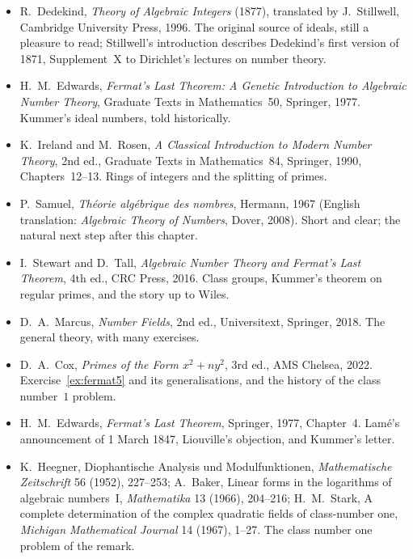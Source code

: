 \begin{itemize}
\item R.~Dedekind, \emph{Theory of Algebraic Integers} (1877), translated by J.~Stillwell, Cambridge University Press, 1996. The original source of ideals, still a pleasure to read; Stillwell's introduction describes Dedekind's first version of 1871, Supplement~X to Dirichlet's lectures on number theory.
\item H.~M.~Edwards, \emph{Fermat's Last Theorem: A Genetic Introduction to Algebraic Number Theory}, Graduate Texts in Mathematics~50, Springer, 1977. Kummer's ideal numbers, told historically.
\item K.~Ireland and M.~Rosen, \emph{A Classical Introduction to Modern Number Theory}, 2nd ed., Graduate Texts in Mathematics~84, Springer, 1990, Chapters~12--13. Rings of integers and the splitting of primes.
\item P.~Samuel, \emph{Th\'eorie alg\'ebrique des nombres}, Hermann, 1967 (English translation: \emph{Algebraic Theory of Numbers}, Dover, 2008). Short and clear; the natural next step after this chapter.
\item I.~Stewart and D.~Tall, \emph{Algebraic Number Theory and Fermat's Last Theorem}, 4th ed., CRC Press, 2016. Class groups, Kummer's theorem on regular primes, and the story up to Wiles.
\item D.~A.~Marcus, \emph{Number Fields}, 2nd ed., Universitext, Springer, 2018. The general theory, with many exercises.
\item D.~A.~Cox, \emph{Primes of the Form $x^2+ny^2$}, 3rd ed., AMS Chelsea, 2022. Exercise~\ref{ex:fermat5} and its generalisations, and the history of the class number~$1$ problem.
\item H.~M.~Edwards, \emph{Fermat's Last Theorem}, Springer, 1977, Chapter~4. Lam\'e's announcement of 1 March 1847, Liouville's objection, and Kummer's letter.
\item K.~Heegner, Diophantische Analysis und Modulfunktionen, \emph{Mathematische Zeitschrift} 56 (1952), 227--253; A.~Baker, Linear forms in the logarithms of algebraic numbers~I, \emph{Mathematika} 13 (1966), 204--216; H.~M.~Stark, A complete determination of the complex quadratic fields of class-number one, \emph{Michigan Mathematical Journal} 14 (1967), 1--27. The class number one problem of the remark.
\end{itemize}

